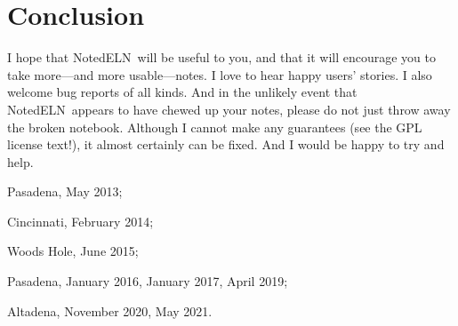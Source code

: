 \documentclass[11pt]{report}
\newcommand{\NotedELN}{NotedELN} %
\begin{document}
\section{Conclusion}

I hope that \NotedELN\ will be useful to you, and that it will encourage you
to take more---and more usable---notes. I love to hear happy users'
stories. I also welcome bug reports of all kinds. And in the unlikely
event that \NotedELN\ appears to have chewed up your notes, please do not
just throw away the broken notebook. Although I cannot make any
guarantees (see the GPL license text!), it almost certainly can be
fixed. And I would be happy to try and help.

\bigskip

\noindent Pasadena, May 2013;

\noindent Cincinnati, February 2014;

\noindent Woods Hole, June 2015;

\noindent Pasadena, January 2016, January 2017, April 2019;

\noindent Altadena, November 2020, May 2021.
\end{document}
